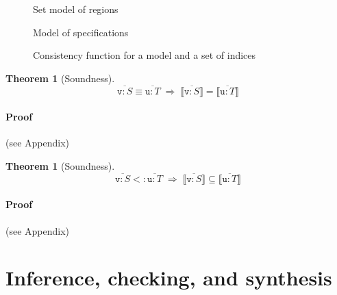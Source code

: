\documentclass[9pt]{sigplanconf}
\newcounter{block}
\theoremstyle{definition}
\newtheorem{theorem}[block]{Theorem}
\newcommand{\interp}[1]{\llbracket{#1}\rrbracket}
\begin{document}

\begin{figure}

\caption{Set model of regions}
\label{fig:region-model}
\end{figure}

\begin{figure}

\caption{Model of specifications}
\label{fig:spatial-model}
\end{figure}

\begin{figure}

\caption{Consistency function for a model and a set of indices}
\label{fig:consistency}
\end{figure}

\begin{theorem}[Soundness]
\[
\overline{\texttt{v} : S}\equiv \overline{\texttt{u} : T}
\; \Rightarrow \;
\interp{\overline{\texttt{v} : S}} = \interp{\overline{\texttt{u} : T}}
\]
\end{theorem}

\paragraph{Proof} (see Appendix)

\begin{theorem}[Soundness]
\[
\overline{\texttt{v} : S} <: \overline{\texttt{u} : T}
\; \Rightarrow \;
\interp{\overline{\texttt{v} : S}} \subseteq \interp{\overline{\texttt{u} : T}}
\]
\end{theorem}

\paragraph{Proof} (see Appendix)



\section{Inference, checking, and synthesis}
\label{sec:analysis}
\end{document}
